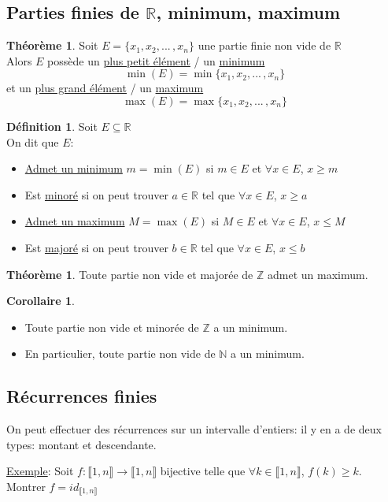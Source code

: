 \documentclass[10pt,a4paper]{article}
\theoremstyle{definition}
\newtheorem{theorem}[proposition]{Théorème}
\newtheorem{corollaire}[proposition]{Corollaire}
\newtheorem{definition}[proposition]{Définition}
\begin{document}
\subsection{Parties finies de $\mathbb{R}$, minimum, maximum}
\begin{theorem}
Soit $E = \{ x_1, x_2, ...\,, x_n \}$ une partie finie non vide de $\mathbb{R}$ \\
Alors $E$ possède un \uline{plus petit élément} / un \uline{minimum}
\[ \min(E) = \min\{x_1, x_2, ...\,, x_n\} \]
et un \uline{plus grand élément} / un \uline{maximum}
\[ \max(E) = \max\{x_1, x_2, ...\,, x_n\} \]
\end{theorem}
\begin{definition}
Soit $E \subseteq \mathbb{R}$ \\
On dit que $E$:
\begin{itemize}
\item \uline{Admet un minimum} $m = \min(E)$ si $m \in E$ et $\forall x \in E$, $x \geq m$
\item Est \uline{minoré} si on peut trouver $a \in \mathbb{R}$ tel que $\forall x \in E$, $x \geq a$
\item \uline{Admet un maximum} $M = \max(E)$ si $M \in E$ et $\forall x \in E$, $x \leq M$
\item Est \uline{majoré} si on peut trouver $b \in \mathbb{R}$ tel que $\forall x \in E$, $x \leq b$
\end{itemize}
\end{definition}
\begin{theorem}
Toute partie non vide et majorée de $\mathbb{Z}$ admet un maximum.
\end{theorem}
\begin{corollaire}
\hfill \begin{itemize}
\item Toute partie non vide et minorée de $\mathbb{Z}$ a un minimum.
\item En particulier, toute partie non vide de $\mathbb{N}$ a un minimum.
\end{itemize}
\end{corollaire}

\subsection{Récurrences finies}
\noindent On peut effectuer des récurrences sur un intervalle d'entiers: il y en a de deux types: montant et descendante. \medskip

\noindent \uline{Exemple}: Soit $f: \llbracket 1, n \rrbracket \to \llbracket 1, n \rrbracket$ bijective telle que $\forall k \in \llbracket 1, n \rrbracket$, $f(k) \geq k$. Montrer $f = id_{\llbracket 1, n \rrbracket}$ \medskip
\end{document}

